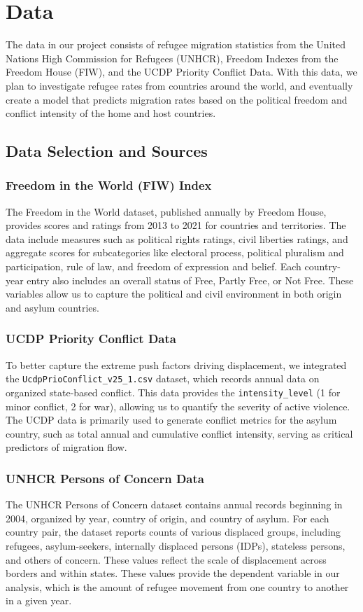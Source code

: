 \documentclass{article}
\theoremstyle{plain}
\theoremstyle{definition}
\theoremstyle{remark}
\begin{document}
\section{Data}
\label{Data}
The data in our project consists of refugee migration statistics from the United Nations High Commission for Refugees (UNHCR), Freedom Indexes from the Freedom House (FIW), and the UCDP Priority Conflict Data. With this data, we plan to investigate refugee rates from countries around the world, and eventually create a model that predicts migration rates based on the political freedom and conflict intensity of the home and host countries.

\subsection{Data Selection and Sources}

\subsubsection*{Freedom in the World (FIW) Index}
The Freedom in the World dataset, published annually by Freedom House, provides scores and ratings from 2013 to 2021 for countries and territories. The data include measures such as political rights ratings, civil liberties ratings, and aggregate scores for subcategories like electoral process, political pluralism and participation, rule of law, and freedom of expression and belief. Each country-year entry also includes an overall status of Free, Partly Free, or Not Free. These variables allow us to capture the political and civil environment in both origin and asylum countries.

\subsubsection*{UCDP Priority Conflict Data}
To better capture the extreme push factors driving displacement, we integrated the \texttt{UcdpPrioConflict\_v25\_1.csv} dataset, which records annual data on organized state-based conflict. This data provides the \texttt{intensity\_level} (1 for minor conflict, 2 for war), allowing us to quantify the severity of active violence. The UCDP data is primarily used to generate conflict metrics for the asylum country, such as total annual and cumulative conflict intensity, serving as critical predictors of migration flow.

\subsubsection*{UNHCR Persons of Concern Data}
The UNHCR Persons of Concern dataset contains annual records beginning in 2004, organized by year, country of origin, and country of asylum. For each country pair, the dataset reports counts of various displaced groups, including refugees, asylum-seekers, internally displaced persons (IDPs), stateless persons, and others of concern. These values reflect the scale of displacement across borders and within states. These values provide the dependent variable in our analysis, which is the amount of refugee movement from one country to another in a given year.
\end{document}
